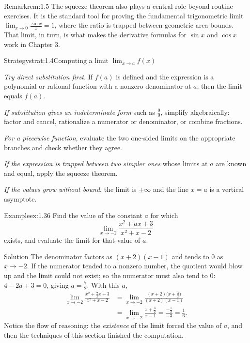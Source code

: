 \documentclass[a4paper,12pt,oneside]{memoir}
\begin{document}
\begin{envremark}{Remark}{rem:1.5}{}
The squeeze theorem also plays a central role beyond routine exercises. It is the standard tool for proving the fundamental trigonometric limit \(\lim_{x \to 0} \frac{\sin x}{x} = 1\), where the ratio is trapped between geometric area bounds. That limit, in turn, is what makes the derivative formulas for \(\sin x\) and \(\cos x\) work in Chapter 3.
\end{envremark}
\begin{envstrategy}{Strategy}{strat:1.4}{Computing a limit \(\lim_{x \to a} f(x)\)}
\begin{steps}
  \item \emph{Try direct substitution first.} If \(f(a)\) is defined and the expression is a polynomial or rational function with a nonzero denominator at \(a\), then the limit equals \(f(a)\).
  \item \emph{If substitution gives an indeterminate form} such as \(\tfrac{0}{0}\), simplify algebraically: factor and cancel, rationalize a numerator or denominator, or combine fractions.
  \item \emph{For a piecewise function}, evaluate the two one-sided limits on the appropriate branches and check whether they agree.
  \item \emph{If the expression is trapped between two simpler ones} whose limits at \(a\) are known and equal, apply the squeeze theorem.
  \item \emph{If the values grow without bound}, the limit is \(\pm\infty\) and the line \(x = a\) is a vertical asymptote.
\end{steps}
\end{envstrategy}
\begin{workedexample}
\begin{envexample}{Example}{ex:1.36}{}
Find the value of the constant \(a\) for which \[ \lim_{x \to -2} \frac{x^{2} + a x + 3}{x^{2} + x - 2} \] exists, and evaluate the limit for that value of \(a\).
\end{envexample}
\begin{envsolution}{Solution}{}{}
The denominator factors as \((x + 2)(x - 1)\) and tends to \(0\) as \(x \to -2\). If the numerator tended to a nonzero number, the quotient would blow up and the limit could not exist; so the numerator must also tend to \(0\): \(4 - 2a + 3 = 0\), giving \(a = \tfrac{7}{2}\). With this \(a\), \[ \begin{aligned} \lim_{x \to -2} \frac{x^{2} + \tfrac{7}{2}x + 3}{x^{2} + x - 2} &= \lim_{x \to -2} \frac{(x + 2)\bigl(x + \tfrac{3}{2}\bigr)}{(x + 2)(x - 1)} \\ &= \lim_{x \to -2} \frac{x + \tfrac{3}{2}}{x - 1} = \frac{-\tfrac{1}{2}}{-3} = \frac{1}{6}. \end{aligned} \] Notice the flow of reasoning: the \emph{existence} of the limit forced the value of \(a\), and then the techniques of this section finished the computation.
\end{envsolution}
\end{workedexample}
\end{document}
